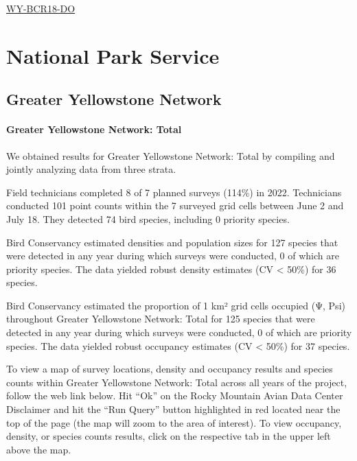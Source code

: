 \documentclass[
  letterpaper,
  DIV=11,
  numbers=noendperiod,
  oneside]{scrreprt}
\begin{document}
\href{http://www.rmbo.org/new_site/adc/QueryWindow.aspx\#N4IgzgLgTghhCuBbEAuABCA6gTQLQCEBhAJQEYAOXAEQHl0qBTABxigkQYDsI0B7AMzSN+XMAxABfIA=}{WY-BCR18-DO}

\hypertarget{national-park-service}{%
\chapter{National Park Service}\label{national-park-service}}

\hypertarget{greater-yellowstone-network}{%
\section{Greater Yellowstone
Network}\label{greater-yellowstone-network}}

\hypertarget{greater-yellowstone-network-total}{%
\subsubsection{Greater Yellowstone Network:
Total}\label{greater-yellowstone-network-total}}

We obtained results for Greater Yellowstone Network: Total by compiling
and jointly analyzing data from three strata.

Field technicians completed 8 of 7 planned surveys (114\%) in 2022.
Technicians conducted 101 point counts within the 7 surveyed grid cells
between June 2 and July 18. They detected 74 bird species, including 0
priority species.

Bird Conservancy estimated densities and population sizes for 127
species that were detected in any year during which surveys were
conducted, 0 of which are priority species. The data yielded robust
density estimates (CV \textless{} 50\%) for 36 species.

Bird Conservancy estimated the proportion of 1 km² grid cells occupied
(Ψ, Psi) throughout Greater Yellowstone Network: Total for 125 species
that were detected in any year during which surveys were conducted, 0 of
which are priority species. The data yielded robust occupancy estimates
(CV \textless{} 50\%) for 37 species.

To view a map of survey locations, density and occupancy results and
species counts within Greater Yellowstone Network: Total across all
years of the project, follow the web link below. Hit ``Ok'' on the Rocky
Mountain Avian Data Center Disclaimer and hit the ``Run Query'' button
highlighted in red located near the top of the page (the map will zoom
to the area of interest). To view occupancy, density, or species counts
results, click on the respective tab in the upper left above the map.
\end{document}
